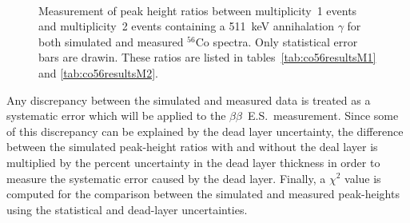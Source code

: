 \documentclass[notitlepage,rmp,aps,10pt]{revtex4-1}
\newcommand{\bb}{${\beta \beta}$}
\newcommand{\bbes}{\bb~E.S.}
\newcommand{\iso}[2]{$^{#1}$#2}
\newcommand{\Co}[1]{\iso{#1}{Co}}
\begin{document}
\begin{figure}[p]
  \centering
  \\
  \caption[Peak height ratio comparison results for module 1 and module 2]{\label{fig:co56results}
    Measurement of peak height ratios between multiplicity~1 events and multiplicity~2 events containing a 511~keV annihalation $\gamma$ for both simulated and measured \Co{56} spectra. Only statistical error bars are drawin. These ratios are listed in tables~\ref{tab:co56resultsM1} and \ref{tab:co56resultsM2}.
  }
\end{figure}
Any discrepancy between the simulated and measured data is treated as a systematic error which will be applied to the \bbes\ measurement.
Since some of this discrepancy can be explained by the dead layer uncertainty, the difference between the simulated peak-height ratios with and without the deal layer is multiplied by the percent uncertainty in the dead layer thickness in order to measure the systematic error caused by the dead layer.
Finally, a $\chi^2$ value is computed for the comparison between the simulated and measured peak-heights using the statistical and dead-layer uncertainties.
\end{document}
